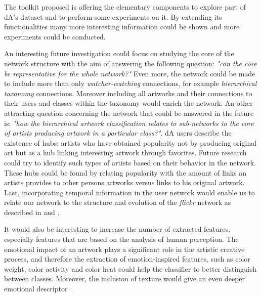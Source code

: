 The toolkit proposed is offering the elementary components to explore part of dA's dataset and to perform some experiments on it. By extending its functionalities many more interesting information could be shown and more experiments could be conducted.

An interesting future investigation could focus on studying the core of the network structure with the aim of answering the following question: \textit{"can the core be representative for the whole network?"}
Even more, the network could be made to include more than only \textit{watcher-watching} connections, for example \textit{hierarchical taxonomy} connections. Moreover including all artworks  and their connections to their users and classes within the taxonomy would enrich the network.
An other attracting question concerning the network that could be answered in the future is: \textit{"how the hierarchical artwork classification relates to sub-networks in the core of artists producing artwork in a particular class?"}.
dA users describe the existence of hubs: artists who have obtained popularity not by producing original art but as a hub linking interesting artwork through favorites. Future research could try to identify such types of artists based on their behavior in the network. These hubs could be found by relating popularity with the amount of links an artists provides to other persons artworks versus links to his original artwork.
Last, incorporating temporal information in the user network would enable us to relate our network to the structure and evolution of the \textit{flickr} network as described in \cite{kumar2006structure} and  \cite{leskovec2008microscopic}.

It would also be interesting to increase the number of extracted features, especially features that are based on the analysis of human perception.
The emotional impact of an artwork plays a significant role in the artistic creative process, and therefore the extraction of emotion-inspired features, such as color weight, color activity and color heat \cite{color_emotion1} could help the classifier to better distinguish between classes.
Moreover, the inclusion of texture would give an even deeper emotional descriptor~\cite{LucassenECCGIV2010}.

